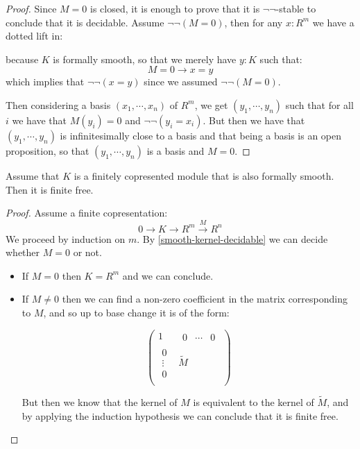 \begin{proof}
Since $M=0$ is closed, it is enough to prove that it is $\neg\neg$-stable to conclude that it is decidable. Assume $\neg\neg(M=0)$, then for any $x:R^m$ we have a dotted lift in:
 \begin{center}
\end{center}
because $K$ is formally smooth, so that we merely have $y:K$ such that: 
\[M=0\to x=y\]
which implies that $\neg\neg(x=y)$ since we assumed $\neg\neg(M=0)$.

Then considering a basis $(x_1,\cdots,x_n)$ of $R^m$, we get $(y_1,\cdots,y_n)$ such that for all $i$ we have that $M(y_i) = 0$ and $\neg\neg(y_i=x_i)$. But then we have that $(y_1,\cdots,y_n)$ is infinitesimally close to a basis and that being a basis is an open proposition, so that $(y_1,\cdots,y_n)$ is a basis and $M=0$.
\end{proof}

\begin{lemma}\label{smooth-corpresented-implies-free}
Assume that $K$ is a finitely copresented module that is also formally smooth. Then it is finite free.
\end{lemma}

\begin{proof}
Assume a finite copresentation:
\[0\to K\to R^m\overset{M}{\to} R^n\]
We proceed by induction on $m$. By \cref{smooth-kernel-decidable} we can decide whether $M=0$ or not.
\begin{itemize}
\item If $M=0$ then $K=R^m$ and we can conclude.
\item If $M\not=0$ then we can find a non-zero coefficient in the matrix corresponding to $M$, and so up to base change it is of the form:

\[
\begin{pmatrix}
1 & \begin{matrix}0&\cdots & 0\end{matrix}  \\
\begin{matrix}0\\ \vdots\\ 0\end{matrix} & \widetilde{M} \\
\end{pmatrix}
\]

But then we know that the kernel of $M$ is equivalent to the kernel of $\widetilde{M}$, and by applying the induction hypothesis we can conclude that it is finite free.
\end{itemize}
\end{proof}


